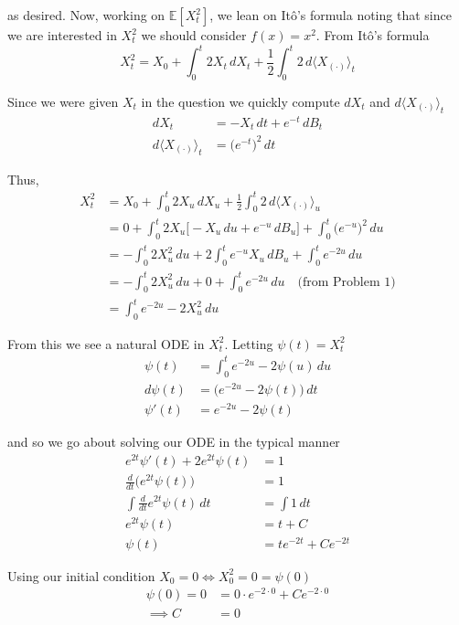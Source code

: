 \documentclass[12pt]{article}
\begin{document}
as desired. Now, working on $\mathbb E[X_t^2]$, we lean on It\^{o}'s formula noting that since we are interested in $X_t^2$ we should consider $f(x) = x^2$. From It\^{o}'s formula
\begin{equation*}
	X_t^2 = X_0 + \int^t_0 2X_t\,dX_t + \frac{1}{2}\int^t_0 2\,d\langle X_{(\cdot)}\rangle_t
\end{equation*}

Since we were given $X_t$ in the question we quickly compute $dX_t$ and $d\langle X_{(\cdot)}\rangle_t$
\begin{align*}
	dX_t &= -X_t\,dt + e^{-t}\,dB_t \\
	d\langle X_{(\cdot)}\rangle_t &= \big(e^{-t}\big)^2\,dt
\end{align*}

Thus,
\begin{align*}
	X_t^2 &= X_0 + \int^t_0 2X_u\,dX_u + \frac{1}{2}\int^t_0 2\,d\langle X_{(\cdot)}\rangle_u \\
	&= 0 + \int^t_0 2X_u\Big[-X_u\,du + e^{-u}\,dB_u\Big] + \int^t_0 \big(e^{-u}\big)^2\,du \\
	&= - \int^t_0 2X_u^2\,du + 2\int^t_0 e^{-u}X_u\,dB_u + \int^t_0 e^{-2u}\,du \\
	&= - \int^t_0 2X_u^2\,du + 0 + \int^t_0 e^{-2u}\,du \quad \text{(from Problem 1)} \\
	&= \int^t_0 e^{-2u} - 2X^2_u \,du
\end{align*}

From this we see a natural ODE in $X_t^2$. Letting $\psi(t) = X_t^2$ 
\begin{align*}
	\psi(t) &= \int^t_0 e^{-2u} - 2\psi(u)\,du \\
	d\psi(t) &= \big(e^{-2u} - 2\psi(t)\big)\,dt \\
	\psi'(t) &= e^{-2u} - 2\psi(t)
\end{align*}

and so we go about solving our ODE in the typical manner
\begin{align*}
	e^{2t}\psi'(t) + 2e^{2t}\psi(t) &= 1 \\
	\frac{d}{dt}\Big(e^{2t}\psi(t)\Big) &= 1 \\
	\int \frac{d}{dt}e^{2t}\psi(t)\,dt &= \int 1\,dt \\
	e^{2t}\psi(t) &= t + C \\
	\psi(t) &= te^{-2t} + Ce^{-2t}
\end{align*}

Using our initial condition $X_0 = 0 \iff X_0^2 = 0 = \psi(0)$
\begin{align*}
	\psi(0) = 0 &= 0\cdot e^{-2\cdot0} + Ce^{-2\cdot 0} \\
	\implies C &= 0
\end{align*}
\end{document}
